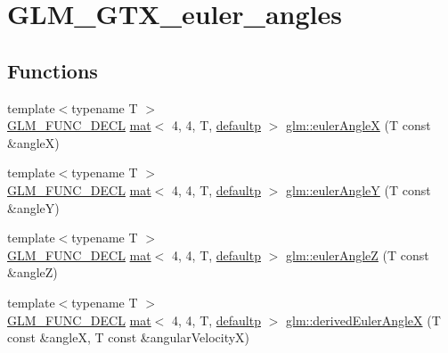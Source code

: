 \hypertarget{group__gtx__euler__angles}{}\section{G\+L\+M\+\_\+\+G\+T\+X\+\_\+euler\+\_\+angles}
\label{group__gtx__euler__angles}
\subsection*{Functions}
\begin{DoxyCompactItemize}
\item 
{\footnotesize template$<$typename T $>$ }\\\mbox{\hyperlink{setup_8hpp_ab2d052de21a70539923e9bcbf6e83a51}{G\+L\+M\+\_\+\+F\+U\+N\+C\+\_\+\+D\+E\+CL}} \mbox{\hyperlink{structglm_1_1mat}{mat}}$<$ 4, 4, T, \mbox{\hyperlink{namespaceglm_a36ed105b07c7746804d7fdc7cc90ff25a9d21ccd8b5a009ec7eb7677befc3bf51}{defaultp}} $>$ \mbox{\hyperlink{group__gtx__euler__angles_gafba6282e4ed3ff8b5c75331abfba3489}{glm\+::euler\+AngleX}} (T const \&angleX)
\item 
{\footnotesize template$<$typename T $>$ }\\\mbox{\hyperlink{setup_8hpp_ab2d052de21a70539923e9bcbf6e83a51}{G\+L\+M\+\_\+\+F\+U\+N\+C\+\_\+\+D\+E\+CL}} \mbox{\hyperlink{structglm_1_1mat}{mat}}$<$ 4, 4, T, \mbox{\hyperlink{namespaceglm_a36ed105b07c7746804d7fdc7cc90ff25a9d21ccd8b5a009ec7eb7677befc3bf51}{defaultp}} $>$ \mbox{\hyperlink{group__gtx__euler__angles_gab84bf4746805fd69b8ecbb230e3974c5}{glm\+::euler\+AngleY}} (T const \&angleY)
\item 
{\footnotesize template$<$typename T $>$ }\\\mbox{\hyperlink{setup_8hpp_ab2d052de21a70539923e9bcbf6e83a51}{G\+L\+M\+\_\+\+F\+U\+N\+C\+\_\+\+D\+E\+CL}} \mbox{\hyperlink{structglm_1_1mat}{mat}}$<$ 4, 4, T, \mbox{\hyperlink{namespaceglm_a36ed105b07c7746804d7fdc7cc90ff25a9d21ccd8b5a009ec7eb7677befc3bf51}{defaultp}} $>$ \mbox{\hyperlink{group__gtx__euler__angles_ga5b3935248bb6c3ec6b0d9297d406e251}{glm\+::euler\+AngleZ}} (T const \&angleZ)
\item 
{\footnotesize template$<$typename T $>$ }\\\mbox{\hyperlink{setup_8hpp_ab2d052de21a70539923e9bcbf6e83a51}{G\+L\+M\+\_\+\+F\+U\+N\+C\+\_\+\+D\+E\+CL}} \mbox{\hyperlink{structglm_1_1mat}{mat}}$<$ 4, 4, T, \mbox{\hyperlink{namespaceglm_a36ed105b07c7746804d7fdc7cc90ff25a9d21ccd8b5a009ec7eb7677befc3bf51}{defaultp}} $>$ \mbox{\hyperlink{group__gtx__euler__angles_ga994b8186b3b80d91cf90bc403164692f}{glm\+::derived\+Euler\+AngleX}} (T const \&angleX, T const \&angular\+VelocityX)

\end{DoxyCompactItemize}
